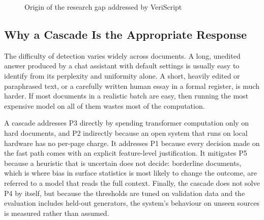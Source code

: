 \begin{figure}[H]
\centering
{}
\caption{Origin of the research gap addressed by VeriScript}
\label{fig:gapmap}
\end{figure}

\subsection{Why a Cascade Is the Appropriate Response}

The difficulty of detection varies widely across documents. A long,
unedited answer produced by a chat assistant with default settings is
usually easy to identify from its perplexity and uniformity alone. A short,
heavily edited or paraphrased text, or a carefully written human essay in a
formal register, is much harder. If most documents in a realistic batch are
easy, then running the most expensive model on all of them wastes most of
the computation.

A cascade addresses P3 directly by spending transformer computation only on
hard documents, and P2 indirectly because an open system that runs on local
hardware has no per-page charge. It addresses P1 because every decision made
on the fast path comes with an explicit feature-level justification. It
mitigates P5 because a heuristic that is uncertain does not decide: borderline
documents, which is where bias in surface statistics is most likely to change
the outcome, are referred to a model that reads the full context. Finally, the
cascade does not solve P4 by itself, but because the thresholds are tuned on
validation data and the evaluation includes held-out generators, the
system's behaviour on unseen sources is measured rather than assumed.

